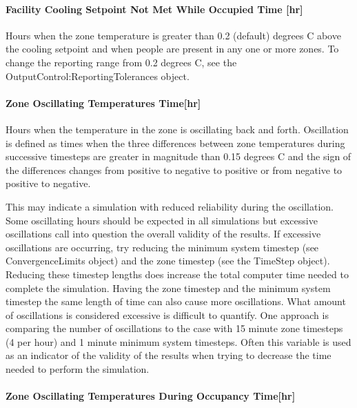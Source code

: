 \paragraph{Facility Cooling Setpoint Not Met While Occupied Time {[}hr{]}}\label{facility-cooling-setpoint-not-met-while-occupied-time-hr}

Hours when the zone temperature is greater than 0.2 (default) degrees C above the cooling setpoint and when people are present in any one or more zones. To change the reporting range from 0.2 degrees C, see the OutputControl:ReportingTolerances object.

\paragraph{Zone Oscillating Temperatures Time{[}hr{]}}\label{zone-oscillating-temperatures-timehr}

Hours when the temperature in the zone is oscillating back and forth. Oscillation is defined as times when the three differences between zone temperatures during successive timesteps are greater in magnitude than 0.15 degrees C and the sign of the differences changes from positive to negative to positive or from negative to positive to negative.

This may indicate a simulation with reduced reliability during the oscillation. Some oscillating hours should be expected in all simulations but excessive oscillations call into question the overall validity of the results. If excessive oscillations are occurring, try reducing the minimum system timestep (see ConvergenceLimits object) and the zone timestep (see the TimeStep object). Reducing these timestep lengths does increase the total computer time needed to complete the simulation. Having the zone timestep and the minimum system timestep the same length of time can also cause more oscillations. What amount of oscillations is considered excessive is difficult to quantify. One approach is comparing the number of oscillations to the case with 15 minute zone timesteps (4 per hour) and 1 minute minimum system timesteps. Often this variable is used as an indicator of the validity of the results when trying to decrease the time needed to perform the simulation.

\paragraph{Zone Oscillating Temperatures During Occupancy Time{[}hr{]}}\label{zone-oscillating-temperatures-during-occupancy-timehr}

